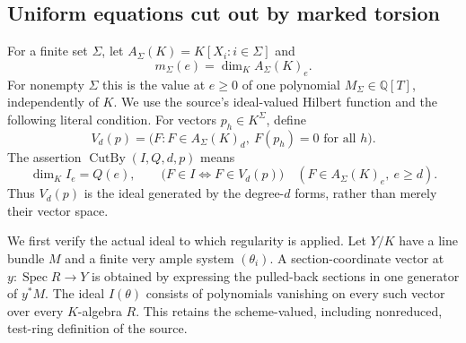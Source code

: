 \subsection{Uniform equations cut out by marked torsion}
\label{subsec:ftb-uniform-torsion-forms}

For a finite set \(\Sigma\), let
\(A_\Sigma(K)=K[X_i:i\in\Sigma]\) and
\[
                         m_\Sigma(e)=\dim_K A_\Sigma(K)_e .
\]
For nonempty \(\Sigma\) this is the value at \(e\ge0\) of
one polynomial \(M_\Sigma\in\mathbb Q[T]\), independently
of \(K\).
We use the source's ideal-valued Hilbert function and the
following literal condition.
For vectors \(p_h\in K^\Sigma\), define
\[
 V_d(p)=\bigl(F:F\in A_\Sigma(K)_d,\
                                  F(p_h)=0\text{ for all }h\bigr).
\]
The assertion \(\operatorname{CutBy}(I,Q,d,p)\) means
\[
       \dim_K I_e=Q(e),\qquad
       \bigl(F\in I\Longleftrightarrow F\in V_d(p)\bigr)
                  \quad(F\in A_\Sigma(K)_e,\ e\ge d).
 \tag{TF1}\label{eq:ftb-cutby-definition}
\]
Thus \(V_d(p)\) is the ideal generated by the degree-\(d\)
forms, rather than merely their vector space.

We first verify the actual ideal to which regularity is applied.
Let \(Y/K\) have a line bundle \(M\) and a finite very ample
system \((\theta_i)\).
A section-coordinate vector at \(y:\operatorname{Spec}R\to Y\)
is obtained by expressing the pulled-back sections in one
generator of \(y^*M\).
The ideal \(I(\theta)\) consists of polynomials vanishing on
every such vector over every \(K\)-algebra \(R\).
This retains the scheme-valued, including nonreduced,
test-ring definition of the source.

